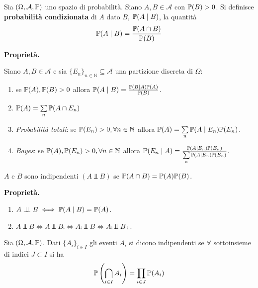 
\ParteEsercizi

\begin{definition}
	Sia $( \Omega ,\mathcal{A} ,\mathbb{P})$ uno spazio di probabilità. Siano $A,B\in \mathcal{A}$ con $\mathbb{P}( B)  >0$. Si definisce \textbf{probabilità condizionata} di $A$ dato $B$, $\mathbb{P}( A\mid B)$, la quantità
	\begin{equation*}
		\mathbb{P}( A\mid B) =\frac{\mathbb{P}( A\cap B)}{\mathbb{P}( B)}
	\end{equation*}
\end{definition}
\textbf{Proprietà.}

Siano $A,B\in \mathcal{A}$ e sia $\{E_{n}\}_{n\in \mathbb{N}} \subseteq \mathcal{A}$ una partizione discreta di $\Omega $:
\begin{enumerate}
	\item se $\mathbb{P}( A) ,\mathbb{P}( B)  >0$ allora $\mathbb{P}( A\mid B) =\frac{\mathbb{P}( B\mid A)\mathbb{P}( A)}{\mathbb{P}( B)}$.
	\item $\mathbb{P}( A) =\sum\limits _{n}\mathbb{P}( A\cap E_{n})$
	\item \textit{Probabilità totali}: se $\mathbb{P}( E_{n})  >0,\forall n\in \mathbb{N}$ allora $\mathbb{P}( A) =\sum\limits _{n}\mathbb{P}( A\mid E_{n})\mathbb{P}( E_{n})$.
	\item \textit{Bayes}: se $\mathbb{P}( A) ,\mathbb{P}( E_{n})  >0,\forall n\in \mathbb{N}$ allora $\mathbb{P}( E_{n} \mid A) =\frac{\mathbb{P}( A\mid E_{n})\mathbb{P}( E_{n})}{\sum\limits _{n}\mathbb{P}( A\mid E_{n})\mathbb{P}( E_{n})}$.
\end{enumerate}
\begin{definition}
	$A$ e $B$ sono indipendenti $( A\Bot B)$ se $\mathbb{P}( A\cap B) =\mathbb{P}( A)\mathbb{P}( B)$.
\end{definition}
\textbf{Proprietà.}
\begin{enumerate}
	\item $A\perp \!\!\! \perp B\iff \mathbb{P}( A\mid B) =\mathbb{P}( A)$.
	\item $A\Bot B\iff A\Bot B\comp \iff A\comp \Bot B\iff A\comp \Bot B\comp$.
\end{enumerate}
\begin{definition}
	Sia $( \Omega ,\mathcal{A} ,\mathbb{P})$. Dati $\{A_{i}\}_{i\in I}$ gli eventi $A_{i}$ si dicono indipendenti se $\forall $ sottoinsieme di indici $J\subset I$ si ha
	\begin{equation*}
		\mathbb{P}\left(\bigcap _{i\in I} A_{i}\right) =\prod _{i\in J}\mathbb{P}( A_{i})
	\end{equation*}
\end{definition}

\Esercizio{}

